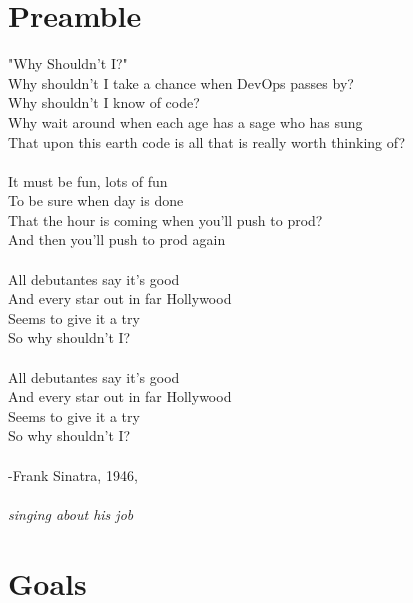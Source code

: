 \documentclass{42-en}
\begin{document}
\chapter{Preamble}

"Why Shouldn't I?"\\

Why shouldn't I take a chance when DevOps passes by?\\
Why shouldn't I know of code?\\
Why wait around when each age has a sage who has sung\\
That upon this earth code is all that is really worth thinking of?\\
\\
It must be fun, lots of fun\\
To be sure when day is done\\
That the hour is coming when you'll push to prod?\\
And then you'll push to prod again\\
\\
All debutantes say it's good\\
And every star out in far Hollywood\\
Seems to give it a try\\
So why shouldn't I?\\
\\
All debutantes say it's good\\
And every star out in far Hollywood\\
Seems to give it a try\\
So why shouldn't I?\\
\\
-Frank Sinatra, 1946,\\
\\
\textit{singing about his job}

\startexercices



\chapter{Goals}
\end{document}
